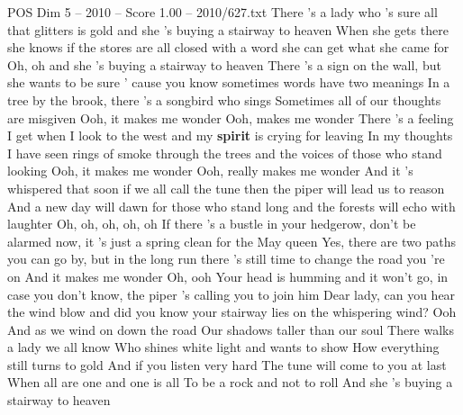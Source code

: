 \begin{textsample}{POS Dim 5 – 2010 – Score 1.00 – 2010/627.txt}  \label{ex:f5_pos_039}
There 's a lady who 's sure all that glitters is gold and she 's buying a stairway to heaven When she gets there she knows if the stores are all closed with a word she can get what she came for Oh, oh and she 's buying a stairway to heaven There 's a sign on the wall, but she wants to be sure ' cause you know sometimes words have two meanings In a tree by the brook, there 's a songbird who sings Sometimes all of our thoughts are misgiven Ooh, it makes me wonder Ooh, makes me wonder There 's a feeling I get when I look to the west and my \textbf{spirit} is crying for leaving In my thoughts I have seen rings of smoke through the trees and the voices of those who stand looking Ooh, it makes me wonder Ooh, really makes me wonder And it 's whispered that soon if we all call the tune then the piper will lead us to reason And a new day will dawn for those who stand long and the forests will echo with laughter Oh, oh, oh, oh, oh If there 's a bustle in your hedgerow, don't be alarmed now, it 's just a spring clean for the May queen Yes, there are two paths you can go by, but in the long run there 's still time to change the road you 're on And it makes me wonder Oh, ooh Your head is humming and it won't go, in case you don't know, the piper 's calling you to join him Dear lady, can you hear the wind blow and did you know your stairway lies on the whispering wind?
Ooh And as we wind on down the road Our shadows taller than our soul There walks a lady we all know Who shines white light and wants to show How everything still turns to gold And if you listen very hard The tune will come to you at last When all are one and one is all To be a rock and not to roll And she 's buying a stairway to heaven

\end{textsample}
